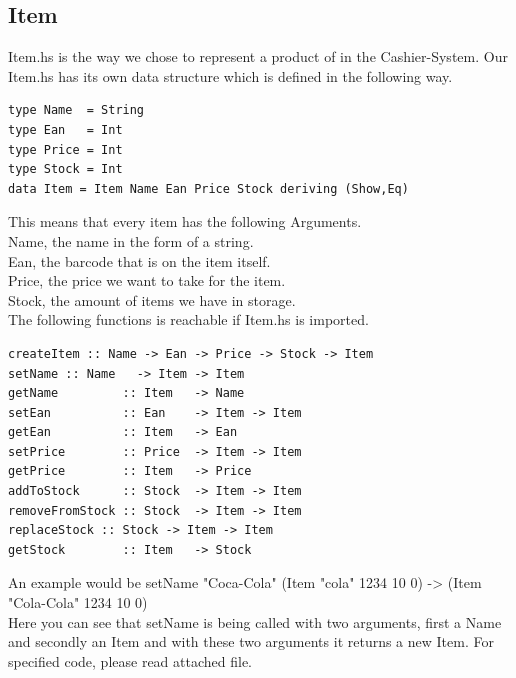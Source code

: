 \documentclass[11pt]{article}
\begin{document}
\subsection{Item}
Item.hs is the way we chose to represent a product of in the Cashier-System. Our Item.hs has its own data structure which is defined in the following way.
\begin{lstlisting}
type Name  = String
type Ean   = Int
type Price = Int
type Stock = Int
data Item = Item Name Ean Price Stock deriving (Show,Eq)
\end{lstlisting}
This means that every item has the following Arguments.\\
Name, the name in the form of a string.\\
Ean, the barcode that is on the item itself.\\
Price, the price we want to take for the item.\\
Stock, the amount of items we have in storage.\\
The following functions is reachable if Item.hs is imported.\\
\begin{lstlisting}
createItem :: Name -> Ean -> Price -> Stock -> Item
setName :: Name   -> Item -> Item
getName         :: Item   -> Name
setEan          :: Ean    -> Item -> Item
getEan          :: Item   -> Ean
setPrice        :: Price  -> Item -> Item
getPrice        :: Item   -> Price
addToStock      :: Stock  -> Item -> Item
removeFromStock :: Stock  -> Item -> Item
replaceStock :: Stock -> Item -> Item
getStock        :: Item   -> Stock
\end{lstlisting}
An example would be setName "Coca-Cola" (Item "cola" 1234 10 0) -> (Item "Cola-Cola" 1234 10 0)\\
Here you can see that setName is being called with two arguments, first a Name and secondly an Item and with these two arguments it returns a new Item. For specified code, please read attached file.
\end{document}

